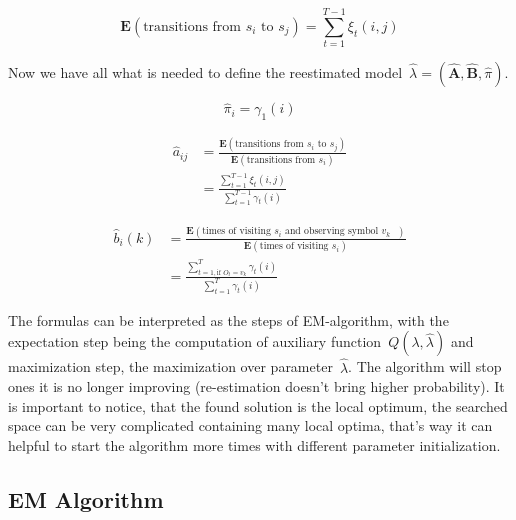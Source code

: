 \documentclass[thesis=M,english]{FITthesis}[2012/10/20]
\newcommand{\matr}[1]{\mathbf{#1}}
\begin{document}
\begin{equation}
\mathbf{E}(\text{transitions from $s_i$ to $s_j$}) = \sum_{t=1}^{T-1} \xi_t(i,j)  
\end{equation}

Now we have all what is needed to define the reestimated model~$\hat\lambda=(\hat{\matr{A}},\hat{\matr{B}},\hat\pi)$.

\begin{equation}\label{eq:bwpi}
\hat\pi_i = \gamma_1(i)  
\end{equation}

\begin{equation}\label{eq:bwa}
\begin{aligned}
\hat a_{ij} &= \frac{\mathbf{E}(\text{transitions from $s_i$ to $s_j$})}
				   {\mathbf{E}(\text{transitions from $s_i$})}  \\
		    &= \frac{\sum\limits_{t=1}^{T-1} \xi_t(i,j)}{\sum\limits_{t=1}^{T-1} \gamma_t(i) }
\end{aligned}
\end{equation}

\begin{equation}\label{eq:bwb}
\begin{aligned}
\hat b_{i}(k) &= \frac{\mathbf{E}(\text{times of visiting $s_i$ and observing symbol $v_k$ })}
				   {\mathbf{E}(\text{times of visiting $s_i$})} \\
			  &= \frac{\sum\limits_{t=1, \text{if } O_t = v_k  }^{T} \gamma_t(i)}{\sum\limits_{t=1}^{T} \gamma_t(i) } 
\end{aligned}
\end{equation}


The formulas can be interpreted as the steps of EM-algorithm, with the expectation step being the computation of auxiliary function~$Q(\lambda,\hat\lambda)$ and maximization step, the maximization over parameter~$\hat\lambda$. The algorithm will stop ones it is no longer improving (re-estimation doesn't bring higher probability). It is important to notice, that the found solution is the local optimum, the searched space can be very complicated containing many local optima, that's way it can helpful to start the algorithm more times with different parameter initialization.  


\subsection{EM Algorithm} 
\end{document}
